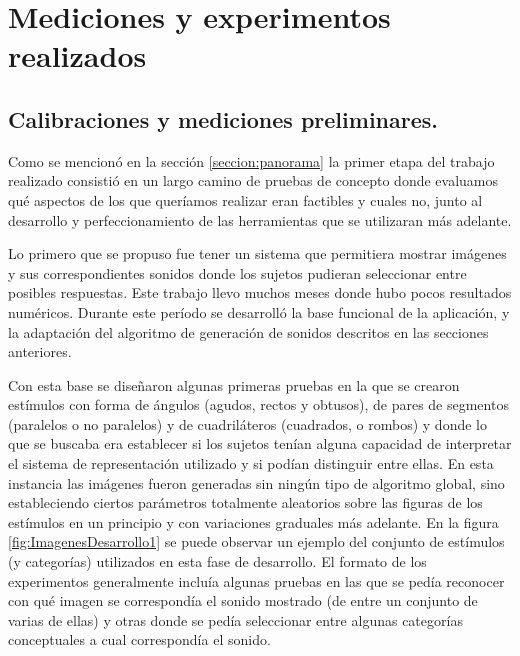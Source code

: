 \documentclass{article}
\numberwithin{figure}{section}
\begin{document}
\section{Mediciones y experimentos realizados}

\subsection{Calibraciones y mediciones preliminares.} \label{resultados:preliminares}

    Como se mencionó en la sección \ref{seccion:panorama} la primer etapa del trabajo realizado consistió en un largo camino de pruebas de concepto donde evaluamos qué aspectos de los que queríamos realizar eran factibles y cuales no, junto al desarrollo y perfeccionamiento de las herramientas que se utilizaran más adelante. 
    
    Lo primero que se propuso fue tener un sistema que permitiera mostrar imágenes y sus correspondientes sonidos donde los sujetos pudieran seleccionar entre posibles respuestas. Este trabajo llevo muchos meses donde hubo pocos resultados numéricos. Durante este período se desarrolló la base funcional de la aplicación, y la adaptación del algoritmo de generación de sonidos descritos en las secciones anteriores. 
    
    Con esta base se diseñaron algunas primeras pruebas en la que se crearon estímulos con forma de ángulos (agudos, rectos y obtusos), de pares de segmentos (paralelos o no paralelos) y de cuadriláteros (cuadrados, o rombos) y donde lo que se buscaba era establecer si los sujetos tenían alguna capacidad de interpretar el sistema de representación utilizado y  si podían distinguir entre ellas. En esta instancia las imágenes fueron generadas sin ningún tipo de algoritmo global, sino estableciendo ciertos parámetros totalmente aleatorios sobre las figuras de los estímulos en un principio y con variaciones graduales más adelante. En la figura \ref{fig:ImagenesDesarrollo1} se puede observar un ejemplo del conjunto de estímulos (y categorías) utilizados en esta fase de desarrollo. El formato de los experimentos generalmente incluía algunas pruebas en las que se pedía reconocer con qué imagen se correspondía el sonido mostrado (de entre un conjunto de varias de ellas) y otras donde se pedía seleccionar entre algunas categorías conceptuales a cual correspondía el sonido. 
    
\end{document}
